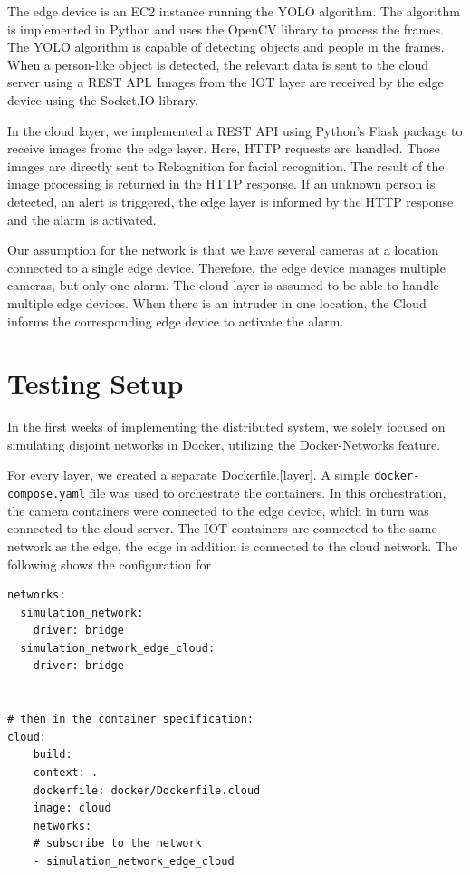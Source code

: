 \documentclass[conference]{IEEEtran}
\begin{document}
The edge device is an EC2 instance running the YOLO algorithm. The algorithm is implemented in Python and uses the OpenCV library to process the frames. The YOLO algorithm is capable of detecting objects and people in the frames. When a person-like object is detected, the relevant data is sent to the cloud server using a REST API. Images from the IOT layer are received by the edge device using the Socket.IO library. 

In the cloud layer, we implemented a REST API using Python's Flask package to receive images fromc the edge layer. Here, HTTP requests are handled. Those images are directly sent to Rekognition for facial recognition. The result of the image processing is returned in the HTTP response. If an unknown person is detected, an alert is triggered, the edge layer is informed by the HTTP response and the alarm is activated.

Our assumption for the network is that we have several cameras at a location connected to a single edge device. Therefore, the edge device manages multiple cameras, but only one alarm. The cloud layer is assumed to be able to handle multiple edge devices. 
When there is an intruder in one location, the Cloud informs the corresponding edge device to activate the alarm. 

\section{Testing Setup}
In the first weeks of implementing the distributed system, we solely focused on simulating disjoint networks in Docker, utilizing the Docker-Networks feature. 

For every layer, we created a separate Dockerfile.[layer]. A simple \texttt{docker-compose.yaml} file was used to orchestrate the containers. In this orchestration, the camera containers were connected to the edge device, which in turn was connected to the cloud server. 
The IOT containers are connected to the same network as the edge, the edge in addition is connected to the cloud network. 
The following shows the configuration for 

\begin{verbatim}
networks:
  simulation_network:
    driver: bridge
  simulation_network_edge_cloud:
    driver: bridge


# then in the container specification: 
cloud: 
    build:
    context: .
    dockerfile: docker/Dockerfile.cloud
    image: cloud
    networks:
    # subscribe to the network
    - simulation_network_edge_cloud 
\end{verbatim}
\end{document}
